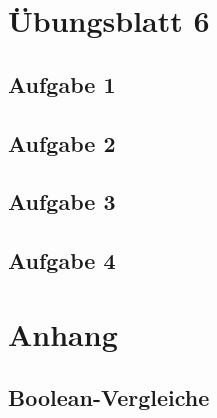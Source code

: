 \documentclass[aspectratio=169,usepdftitle=true,11pt,ngerman,t]{beamer}
\subtitle{Tutorium 7}
\date{29. November 2024}
\begin{document}
\section[Übungsblatt 6]{Übungsblatt 6}

\subsection{Aufgabe 1}


\subsection{Aufgabe 2}


\subsection{Aufgabe 3}


\subsection{Aufgabe 4}


\section[Ich muss noch ein wenig schimpfen...]{Anhang}

\subsection{Boolean-Vergleiche}

\end{document}
